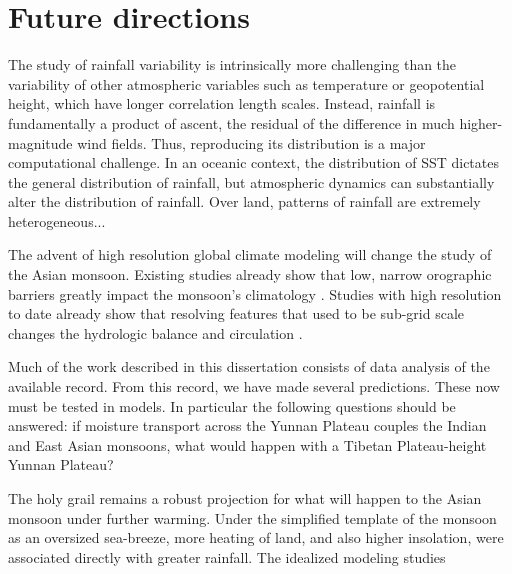 \section{Future directions}

	The study of rainfall variability is intrinsically more challenging than the variability of other atmospheric variables such as temperature or geopotential height, which have longer correlation length scales. Instead, rainfall is fundamentally a product of ascent, the residual of the difference in much higher-magnitude wind fields. Thus, reproducing its distribution is a major computational challenge. In an oceanic context, the distribution of SST dictates the general distribution of rainfall, but atmospheric dynamics can substantially alter the distribution of rainfall. Over land, patterns of rainfall are extremely heterogeneous...

	The advent of high resolution global climate modeling will change the study of the Asian monsoon. Existing studies already show that low, narrow orographic barriers greatly impact the monsoon's climatology \citep{Xie2006}. Studies with high resolution to date already show that resolving features that used to be sub-grid scale changes the hydrologic balance and circulation \citep{Risi2010,Wu2014,Wu2016}.
	
	Much of the work described in this dissertation consists of data analysis of the available record. From this record, we have made several predictions. These now must be tested in models. In particular the following questions should be answered: if moisture transport across the Yunnan Plateau couples the Indian and East Asian monsoons, what would happen with a Tibetan Plateau-height Yunnan Plateau?
	
	The holy grail remains a robust projection for what will happen to the Asian monsoon under further warming. Under the simplified template of the monsoon as an oversized sea-breeze, more heating of land, and also higher insolation, were associated directly with greater rainfall. The idealized modeling studies 